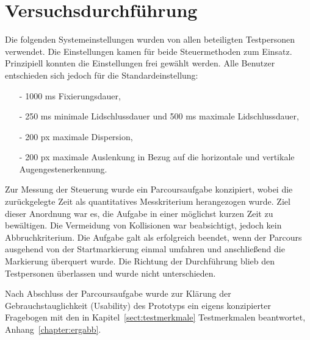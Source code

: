 \section{Versuchsdurchführung}
\label{section:versuchsdurchführung}
Die folgenden Systemeinstellungen wurden von allen beteiligten Testpersonen verwendet. Die Einstellungen kamen für beide Steuermethoden zum Einsatz. Prinzipiell konnten die Einstellungen frei gewählt werden. Alle Benutzer entschieden sich jedoch für die Standardeinstellung:

\begin{itemize}
 \item[-] 1000 ms Fixierungsdauer,
 \item[-] 250 ms minimale Lidschlussdauer und 500 ms maximale Lidschlussdauer,
 \item[-] 200 px maximale Dispersion,
 \item[-] 200 px maximale Auslenkung in Bezug auf die horizontale und vertikale Augengestenerkennung.
\end{itemize}

Zur Messung der Steuerung wurde ein Parcoursaufgabe konzipiert, wobei die zurückgelegte Zeit als quantitatives Messkriterium herangezogen wurde. Ziel dieser Anordnung war es, die Aufgabe in einer möglichst kurzen Zeit zu bewältigen. Die Vermeidung von Kollisionen war beabsichtigt, jedoch kein Abbruchkriterium. Die Aufgabe galt als erfolgreich beendet, wenn der Parcours ausgehend von der Startmarkierung einmal umfahren und anschließend die Markierung überquert wurde. Die Richtung der Durchführung blieb den Testpersonen überlassen und wurde nicht unterschieden.

Nach Abschluss der Parcoursaufgabe wurde zur Klärung der Gebrauchstauglichkeit (Usability) des Prototyps ein eigens konzipierter Fragebogen mit den in Kapitel~\ref{sect:testmerkmale} Testmerkmalen beantwortet, \vgl Anhang~\ref{chapter:ergabb}. 

